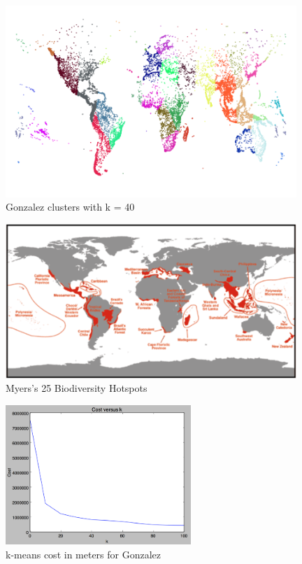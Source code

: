 \documentclass[11pt, fullpage,letterpaper]{article}
\begin{document}
		\begin{figure}[H]
			\centering
			\includegraphics[width=11cm]{gonzalez.png}
			\caption{Gonzalez clusters with k = 40}
		\end{figure}
		
		\begin{figure}[H]
			\centering
			\includegraphics[width=11cm]{myers.png}
			\caption{Myers's 25 Biodiversity Hotspots}
		\end{figure}
		
		\begin{figure}[H]
			\centering
			\includegraphics[width=7cm]{kMeansCost.png}
			\caption{k-means cost in meters for Gonzalez}
		\end{figure}
			
\end{document}
